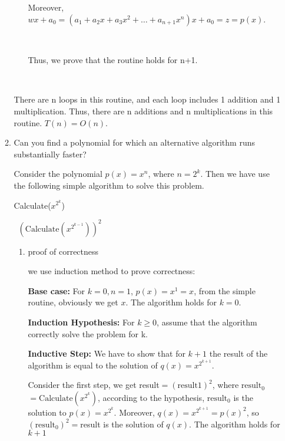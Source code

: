 \documentclass[11pt]{article}
\begin{document}
\begin{enumerate}
\begin{enumerate}
\begin{enumerate}
	    Moreover, $wx+a_0=(a_1+a_2x+a_3x^2+\dots+a_{n+1}x^n)x+a_0=z=p(x)$.
	    
	    \
	    	    
	    Thus, we prove that the routine holds for n+1.
	\end{enumerate}
	
	
	\
	
	There are n loops in this routine, and each loop includes 1 addition and 1 multiplication. Thus, there are n additions and n multiplications in this routine. $T(n)=O(n).$
	

	\item Can you find a polynomial for which an alternative algorithm runs substantially faster?
     
    Consider the polynomial $p(x)=x^n$, where $n=2^k$. Then we have use the following simple algorithm to solve this problem.
    \
    
    \begin{algorithm}[H]
    \caption{Calculate($x^{2^k}$)}	
    \begin{algorithmic}
    \State {}
    \Else \ \Return $(\text{Calculate}(x^{2^{k-1}}))^2$
    \EndIf
    \end{algorithmic}
    \end{algorithm}
       
    \begin{enumerate}
    
    \item  proof of correctness
    
    we use induction method to prove correctness:
    
    \textbf{Base case:} 
    For $k=0, n=1$, $p(x)=x^1=x$, from the simple routine, obviously we get $x$. The algorithm holds for $k=0$.
    
    \textbf{Induction Hypothesis:} 
    For $k \geq 0$, assume that the algorithm correctly solve the problem for k.
   
    \textbf{Inductive Step:}
    We have to show that for $k+1$ the result of the algorithm is equal to the solution of $q(x)=x^{2^{k+1}}$.
    
    Consider the first step, we get result$=(\text{result1})^2$, where $\text{result}_0$$=\text{Calculate}(x^{2^{k}})$, according to the hypothesis, $\text{result}_0$ is the solution to $p(x)=x^{2^{k}}$. Moreover, $q(x)=x^{2^{k+1}}=p(x)^2$, so $(\text{result}_0)^2 =$result is the solution of $q(x)$. The algorithm holds for $k+1$  
    

\end{enumerate}
\end{enumerate}
\end{enumerate}
\end{document}

